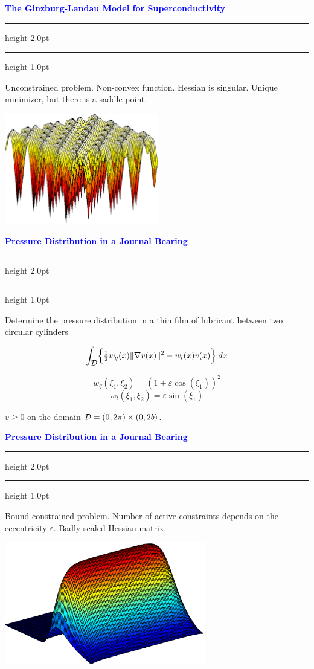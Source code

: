 \documentclass{seminar}
\newcommand{\grad}{\nabla}
\newcommand{\half}{{\textstyle{\frac{1}{2}}}}
\newcommand{\redstripe}{\textcolor{BrickRed}{\hrule height 2.0pt\hfil}
             \vspace{-1.8pt}
             \textcolor{BrickRed}{\hrule height 1.0pt\hfil}
}
\newcommand{\heading}[1]{%
   \vspace*{0.5pt}%
   \centerline{\textcolor{Blue}{\textbf{#1}}}%
   \redstripe
}
\newcommand{\cD} {\mbox{$\cal D$}}
\begin{document}
\begin{slide}

\heading{The Ginzburg-Landau Model for Superconductivity}

Unconstrained problem. Non-convex function. Hessian is singular.
Unique minimizer, but there is a saddle point.

\centerline {\includegraphics[height=1.9in]{../images/gl2.eps}}

\end{slide}

\begin{slide}

\heading{Pressure Distribution in a Journal Bearing}

Determine the pressure distribution in a thin film of lubricant
between two circular cylinders

\[
\int_{\cD} \Bigl \{ \half w_q (x) \| \grad v(x) \|^2 - w_l(x) v(x) \Bigr \} \; dx
\]

\[
w_q ( \xi_1 , \xi_2 ) = \left ( 1 + \varepsilon \cos(\xi_1) \right ) ^ 2
\]
\[
w_l ( \xi_1 , \xi_2 ) =  \varepsilon \sin (\xi_1)
\]

\medskip

\begin{center}
$ v \ge 0 $ on the domain $ \cD = ( 0 , 2 \pi ) \times ( 0 , 2 b ) $.
\end{center}

\vfill

\end{slide}

\begin{slide}

\heading{Pressure Distribution in a Journal Bearing}

Bound constrained problem. 
Number of active constraints depends on the eccentricity $ \varepsilon $.
Badly scaled Hessian matrix.
%
\centerline {\includegraphics[height=2.1in]{../images/pjb.eps}}

\end{slide}
\end{document}
